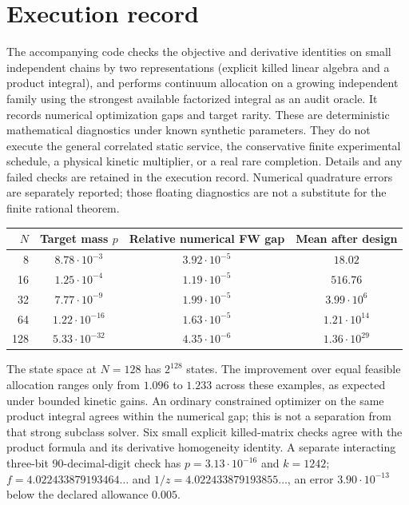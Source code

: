 \documentclass[11pt]{article}
\begin{document}
\section{Execution record}
The accompanying code checks the objective and derivative identities on
small independent chains by two representations (explicit killed linear
algebra and a product integral), and performs continuum allocation on a
growing independent family using the strongest available factorized
integral as an audit oracle. It records numerical optimization gaps and
target rarity. These are deterministic mathematical diagnostics under
known synthetic parameters. They do not execute the general correlated
static service, the conservative finite experimental schedule, a physical
kinetic multiplier, or a real rare completion. Details and any failed
checks are retained in the execution record. Numerical quadrature errors
are separately reported; those floating diagnostics are not a substitute
for the finite rational theorem.

\begin{center}
\begin{tabular}{rccc}
\toprule
$N$ & Target mass $p$ & Relative numerical FW gap & Mean after design\\
\midrule
8 & $8.78\cdot10^{-3}$ & $3.92\cdot10^{-5}$ & $18.02$\\
16 & $1.25\cdot10^{-4}$ & $1.19\cdot10^{-5}$ & $516.76$\\
32 & $7.77\cdot10^{-9}$ & $1.99\cdot10^{-5}$ & $3.99\cdot10^6$\\
64 & $1.22\cdot10^{-16}$ & $1.63\cdot10^{-5}$ & $1.21\cdot10^{14}$\\
128 & $5.33\cdot10^{-32}$ & $4.35\cdot10^{-6}$ & $1.36\cdot10^{29}$\\
\bottomrule
\end{tabular}
\end{center}
The state space at $N=128$ has $2^{128}$ states. The improvement over equal
feasible allocation ranges only from $1.096$ to $1.233$ across these
examples, as expected under bounded kinetic gains. An ordinary constrained
optimizer on the same product integral agrees within the numerical gap;
this is not a separation from that strong subclass solver. Six small
explicit killed-matrix checks agree with the product formula and its
derivative homogeneity identity. A separate interacting three-bit
90-decimal-digit check has $p=3.13\cdot10^{-16}$ and $k=1242$;
$f=4.022433879193464\ldots$ and $1/z=4.022433879193855\ldots$,
an error $3.90\cdot10^{-13}$ below the declared allowance $0.005$.
\end{document}
